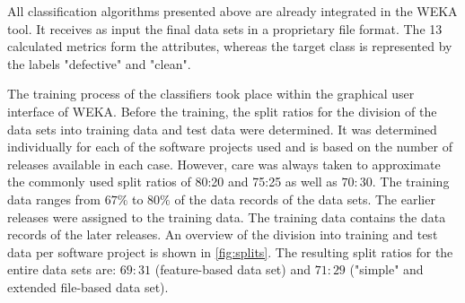 All classification algorithms presented above are already integrated in the WEKA tool. It receives as input the final data sets in a proprietary file format. The 13 calculated metrics form the attributes, whereas the target class is represented by the labels "defective" and "clean".

The training process of the classifiers took place within the graphical user interface of WEKA. Before the training, the split ratios for the division of the data sets into training data and test data were determined. It was determined individually for each of the software projects used and is based on the number of releases available in each case. However, care was always taken to approximate the commonly used split ratios of 80:20 and 75:25 as well as $70:30$. The training data ranges from $67\%$ to $80\%$ of the data records of the data sets. The earlier releases were assigned to the training data. The training data contains the data records of the later releases. An overview of the division into training and test data per software project is shown in \autoref{fig:splits}. The resulting split ratios for the entire data sets are: $69:31$ (feature-based data set) and $71:29$ ("simple" and extended file-based data set).


